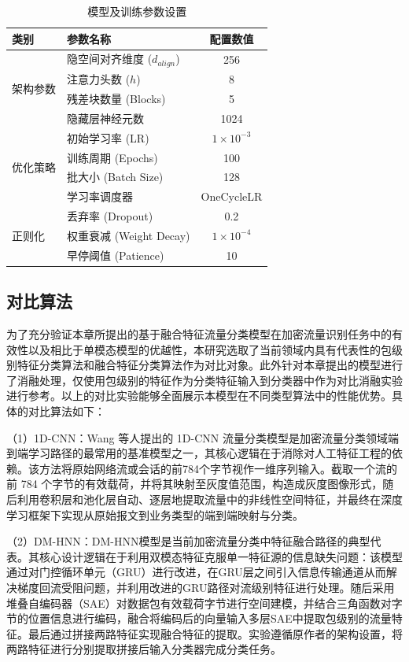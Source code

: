 \begin{table}[htbp]
\centering
\caption{模型及训练参数设置}
\label{tab:hyperparameters}
\begin{tabular}{llc}
\hline
\textbf{类别} & \textbf{参数名称} & \textbf{配置数值} \\ \midrule
\multirow{4}{*}{架构参数} & 隐空间对齐维度 ($d_{align}$) & 256 \\
 & 注意力头数 ($h$) & 8 \\
 & 残差块数量 (Blocks) & 5 \\
 & 隐藏层神经元数 & 1024 \\ \hline
\multirow{4}{*}{优化策略} & 初始学习率 (LR) & $1 \times 10^{-3}$ \\
 & 训练周期 (Epochs) & 100 \\
 & 批大小 (Batch Size) & 128 \\
 & 学习率调度器 & OneCycleLR \\ \hline
\multirow{3}{*}{正则化} & 丢弃率 (Dropout) & 0.2 \\
 & 权重衰减 (Weight Decay) & $1 \times 10^{-4}$ \\
 & 早停阈值 (Patience) & 10 \\\hline
\end{tabular}
\end{table}

\subsection{对比算法}
为了充分验证本章所提出的基于融合特征流量分类模型在加密流量识别任务中的有效性以及相比于单模态模型的优越性，本研究选取了当前领域内具有代表性的包级别特征分类算法和融合特征分类算法作为对比对象。此外针对本章提出的模型进行了消融处理，仅使用包级别的特征作为分类特征输入到分类器中作为对比消融实验进行参考。以上的对比实验能够全面展示本模型在不同类型算法中的性能优势。具体的对比算法如下：

（1）1D-CNN\cite{wang2017end}：Wang 等人提出的 1D-CNN 流量分类模型是加密流量分类领域端到端学习路径的最常用的基准模型之一，其核心逻辑在于消除对人工特征工程的依赖。该方法将原始网络流或会话的前784个字节视作一维序列输入。截取一个流的前 784 个字节的有效载荷，并将其映射至灰度值范围，构造成灰度图像形式，随后利用卷积层和池化层自动、逐层地提取流量中的非线性空间特征，并最终在深度学习框架下实现从原始报文到业务类型的端到端映射与分类。

（2）DM-HNN\cite{yang2023network}：DM-HNN模型是当前加密流量分类中特征融合路径的典型代表。其核心设计逻辑在于利用双模态特征克服单一特征源的信息缺失问题：该模型通过对门控循环单元（GRU）进行改进，在GRU层之间引入信息传输通道从而解决梯度回流受阻问题，并利用改进的GRU路径对流级别特征进行处理。随后采用堆叠自编码器（SAE）对数据包有效载荷字节进行空间建模，并结合三角函数对字节的位置信息进行编码，融合将编码后的向量输入多层SAE中提取包级别的流量特征。最后通过拼接两路特征实现融合特征的提取。实验遵循原作者的架构设置，将两路特征进行分别提取拼接后输入分类器完成分类任务。

